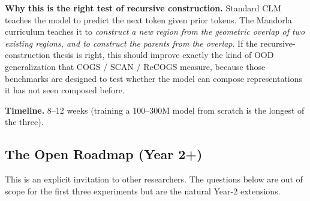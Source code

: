 \documentclass[11pt,a4paper]{article}
\begin{document}
\textbf{Why this is the right test of recursive construction.} Standard CLM teaches the model to predict the next token given prior tokens. The Mandorla curriculum teaches it to \emph{construct a new region from the geometric overlap of two existing regions, and to construct the parents from the overlap}. If the recursive-construction thesis is right, this should improve exactly the kind of OOD generalization that COGS / SCAN / ReCOGS measure, because those benchmarks are designed to test whether the model can compose representations it has not seen composed before.

\textbf{Timeline.} 8--12 weeks (training a 100--300M model from scratch is the longest of the three).

\subsection{The Open Roadmap (Year 2+)}

This is an explicit invitation to other researchers. The questions below are out of scope for the first three experiments but are the natural Year-2 extensions.
\end{document}
